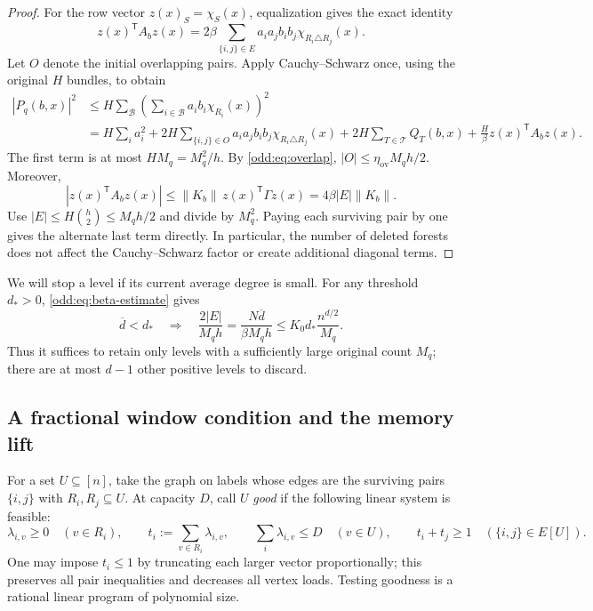 \documentclass[letterpaper,11pt]{article}
\theoremstyle{definition}
\begin{document}
\begin{proof}
For the row vector $z(x)_S=\chi_S(x)$, equalization gives the exact identity
\begin{equation}\label{odd:eq:polynomial-identity}
 z(x)^{\mathsf T}A_bz(x)
 =2\beta\sum_{\{i,j\}\in E}a_i a_jb_i b_j
                                      \chi_{R_i\triangle R_j}(x).
\end{equation}
Let $O$ denote the initial overlapping pairs.  Apply Cauchy--Schwarz once,
using the original $H$ bundles, to obtain
\begin{align*}
 |P_q(b,x)|^2
 &\leq H\sum_{\mathcal B}
              \left(\sum_{i\in\mathcal B}a_i b_i\chi_{R_i}(x)\right)^2\\
 &=H\sum_i a_i^2
   +2H\sum_{\{i,j\}\in O}a_i a_jb_i b_j\chi_{R_i\triangle R_j}(x)
   +2H\sum_{T\in\mathcal T}Q_T(b,x)
   +\frac H\beta z(x)^{\mathsf T}A_bz(x).
\end{align*}
The first term is at most $HM_q=M_q^2/h$.  By
\eqref{odd:eq:overlap}, $|O|\leq\eta_{\mathrm{ov}}M_qh/2$.
Moreover,
\[
 |z(x)^{\mathsf T}A_bz(x)|
 \leq\|K_b\|\,z(x)^{\mathsf T}\Gamma z(x)
 =4\beta|E|\|K_b\|.
\]
Use $|E|\leq H\binom h2\leq M_qh/2$ and divide by $M_q^2$.
Paying each surviving pair by one gives the alternate last term directly.
In particular, the number of deleted forests does not affect the
Cauchy--Schwarz factor or create additional diagonal terms.
\end{proof}

We will stop a level if its current average degree is small.  For any
threshold $d_*>0$, \eqref{odd:eq:beta-estimate} gives
\begin{equation}\label{odd:eq:low-degree}
 \overline d<d_*\quad\Longrightarrow\quad
 \frac{2|E|}{M_qh}
 =\frac{N\overline d}{\beta M_qh}
 \leq K_0d_*\frac{n^{d/2}}{M_q}.
\end{equation}
Thus it suffices to retain only levels with a sufficiently large original
count $M_q$; there are at most $d-1$ other positive levels to discard.

\subsection{A fractional window condition and the memory lift}

For a set $U\subseteq[n]$, take the graph on labels whose edges are the
surviving pairs $\{i,j\}$ with $R_i,R_j\subseteq U$.  At capacity $D$,
call $U$ \emph{good} if the following linear system is feasible:
\begin{equation}\label{odd:eq:window-lp}
 \lambda_{i,v}\geq0\quad(v\in R_i),\qquad
 t_i:=\sum_{v\in R_i}\lambda_{i,v},\qquad
 \sum_i\lambda_{i,v}\leq D\quad(v\in U),\qquad
 t_i+t_j\geq1\quad(\{i,j\}\in E[U]).
\end{equation}
One may impose $t_i\leq1$ by truncating each larger vector proportionally;
this preserves all pair inequalities and decreases all vertex loads.
Testing goodness is a rational linear program of polynomial size.
\end{document}
